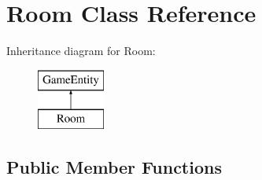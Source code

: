 \hypertarget{class_room}{}\section{Room Class Reference}
\label{class_room}
Inheritance diagram for Room\+:\begin{figure}[H]
\begin{center}
\leavevmode
\includegraphics[height=2.000000cm]{class_room}
\end{center}
\end{figure}
\subsection*{Public Member Functions}
